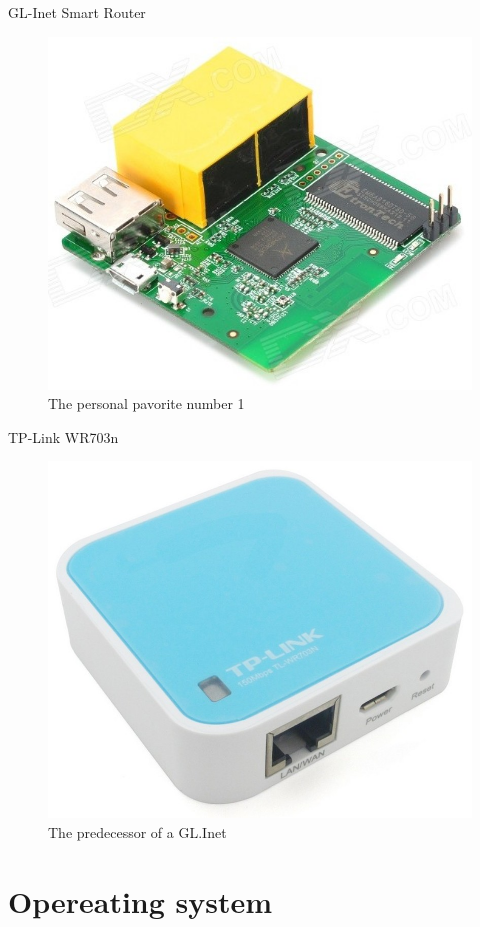 \documentclass[hyperref={unicode}]{beamer}
\begin{document}
\begin{frame}{GL-Inet Smart Router}
	\begin{figure}
	\includegraphics[width=.7\textwidth]{glinet.jpg}
	\caption{The personal pavorite number 1}
	\end{figure}
\end{frame}


\begin{frame}{TP-Link WR703n}
	\begin{figure}
	\includegraphics[width=.7\textwidth]{wr703n.jpg}
	\caption{The predecessor of a GL.Inet}
	\end{figure}
\end{frame}


\section{Opereating system}
\end{document}
